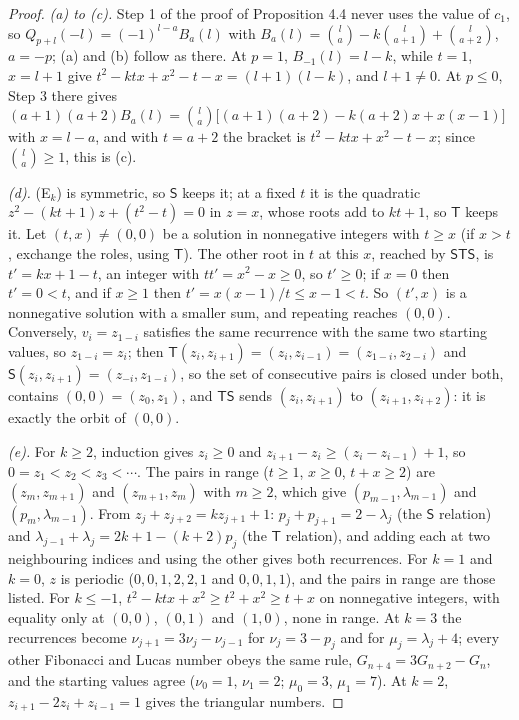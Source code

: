 \documentclass[11pt]{article}
\begin{document}
\begin{proof}
\emph{(a) to (c).} Step 1 of the proof of Proposition 4.4 never uses the value of $c_1$, so $Q_{p+l}(-l)=(-1)^{l-a}B_a(l)$ with $B_a(l)=\binom{l}{a}-k\binom{l}{a+1}+\binom{l}{a+2}$, $a=-p$; (a) and (b) follow as there. At $p=1$, $B_{-1}(l)=l-k$, while $t=1$, $x=l+1$ give $t^2-ktx+x^2-t-x=(l+1)(l-k)$, and $l+1\ne0$. At $p\le0$, Step 3 there gives $(a+1)(a+2)B_a(l)=\binom{l}{a}\bigl[(a+1)(a+2)-k(a+2)x+x(x-1)\bigr]$ with $x=l-a$, and with $t=a+2$ the bracket is $t^2-ktx+x^2-t-x$; since $\binom{l}{a}\ge1$, this is (c).

\emph{(d).} (E$_k$) is symmetric, so $\mathsf{S}$ keeps it; at a fixed $t$ it is the quadratic $z^2-(kt+1)z+(t^2-t)=0$ in $z=x$, whose roots add to $kt+1$, so $\mathsf{T}$ keeps it. Let $(t,x)\ne(0,0)$ be a solution in nonnegative integers with $t\ge x$ (if $x>t$, exchange the roles, using $\mathsf{T}$). The other root in $t$ at this $x$, reached by $\mathsf{S}\mathsf{T}\mathsf{S}$, is $t'=kx+1-t$, an integer with $tt'=x^2-x\ge0$, so $t'\ge0$; if $x=0$ then $t'=0<t$, and if $x\ge1$ then $t'=x(x-1)/t\le x-1<t$. So $(t',x)$ is a nonnegative solution with a smaller sum, and repeating reaches $(0,0)$. Conversely, $v_i=z_{1-i}$ satisfies the same recurrence with the same two starting values, so $z_{1-i}=z_i$; then $\mathsf{T}(z_i,z_{i+1})=(z_i,z_{i-1})=(z_{1-i},z_{2-i})$ and $\mathsf{S}(z_i,z_{i+1})=(z_{-i},z_{1-i})$, so the set of consecutive pairs is closed under both, contains $(0,0)=(z_0,z_1)$, and $\mathsf{T}\mathsf{S}$ sends $(z_i,z_{i+1})$ to $(z_{i+1},z_{i+2})$: it is exactly the orbit of $(0,0)$.

\emph{(e).} For $k\ge2$, induction gives $z_i\ge0$ and $z_{i+1}-z_i\ge(z_i-z_{i-1})+1$, so $0=z_1<z_2<z_3<\cdots$. The pairs in range ($t\ge1$, $x\ge0$, $t+x\ge2$) are $(z_m,z_{m+1})$ and $(z_{m+1},z_m)$ with $m\ge2$, which give $(p_{m-1},\lambda_{m-1})$ and $(p_m,\lambda_{m-1})$. From $z_j+z_{j+2}=kz_{j+1}+1$: $p_j+p_{j+1}=2-\lambda_j$ (the $\mathsf{S}$ relation) and $\lambda_{j-1}+\lambda_j=2k+1-(k+2)p_j$ (the $\mathsf{T}$ relation), and adding each at two neighbouring indices and using the other gives both recurrences. For $k=1$ and $k=0$, $z$ is periodic ($0,0,1,2,2,1$ and $0,0,1,1$), and the pairs in range are those listed. For $k\le-1$, $t^2-ktx+x^2\ge t^2+x^2\ge t+x$ on nonnegative integers, with equality only at $(0,0)$, $(0,1)$ and $(1,0)$, none in range. At $k=3$ the recurrences become $\nu_{j+1}=3\nu_j-\nu_{j-1}$ for $\nu_j=3-p_j$ and for $\mu_j=\lambda_j+4$; every other Fibonacci and Lucas number obeys the same rule, $G_{n+4}=3G_{n+2}-G_n$, and the starting values agree ($\nu_0=1$, $\nu_1=2$; $\mu_0=3$, $\mu_1=7$). At $k=2$, $z_{i+1}-2z_i+z_{i-1}=1$ gives the triangular numbers.
\end{proof}
\end{document}
